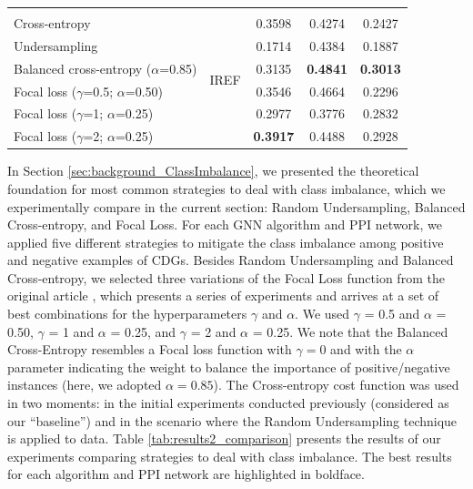 \begin{table}[!bh]
\begin{tabular}{lcccc}
                                  &        &                 &                 &                 \\
Cross-entropy                     & \multirow{6}{*}{IREF}            & 0.3598          & 0.4274          & 0.2427          \\
Undersampling                     &             & 0.1714          & 0.4384          & 0.1887          \\
Balanced cross-entropy ($\alpha$=0.85) &             & 0.3135          & \textbf{0.4841} & \textbf{0.3013} \\
Focal loss ($\gamma$=0.5; $\alpha$=0.50)        &             & 0.3546          & 0.4664          & 0.2296          \\
Focal loss ($\gamma$=1; $\alpha$=0.25)          &             & 0.2977          & 0.3776          & 0.2832          \\
Focal loss ($\gamma$=2; $\alpha$=0.25)          &             & \textbf{0.3917} & 0.4488          & 0.2928          \\ \hline
\end{tabular}
\end{table}


In Section \ref{sec:background_ClassImbalance}, we presented the theoretical foundation for most common strategies to deal with class imbalance, which we experimentally compare in the current section: Random Undersampling, Balanced Cross-entropy, and Focal Loss. For each GNN algorithm and PPI network, we applied five different strategies to mitigate the class imbalance among positive and negative examples of CDGs. Besides Random Undersampling and Balanced Cross-entropy, we selected three variations of the Focal Loss function from the original article \cite{lin2017focal}, which presents a series of experiments and arrives at a set of best combinations for the hyperparameters $\gamma$ and $\alpha$. We used $\gamma$ = 0.5 and $\alpha$ = 0.50, $\gamma$ = 1 and $\alpha$ = 0.25, and $\gamma$ = 2 and $\alpha$ = 0.25. We note that the Balanced Cross-Entropy resembles a Focal loss function with $\gamma = 0$ and with the $\alpha$ parameter indicating the weight to balance the importance of positive/negative instances (here, we adopted  $\alpha = 0.85$). The Cross-entropy cost function was used in two moments: in the initial experiments conducted previously (considered as our ``baseline'') and in the scenario where the Random Undersampling technique is applied to data. Table \ref{tab:results2_comparison} presents the results of our experiments comparing strategies to deal with class imbalance. The best results for each algorithm and PPI network are highlighted in boldface.



